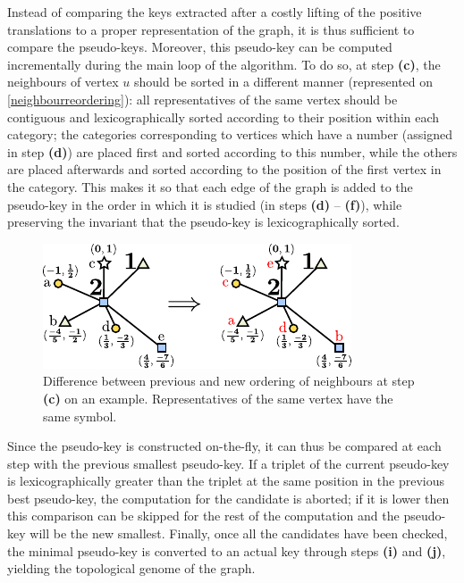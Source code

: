 \documentclass[main.tex]{subfiles}
\begin{document}
Instead of comparing the keys extracted after a costly lifting of the positive translations to a proper representation of the graph, it is thus sufficient to compare the pseudo-keys. Moreover, this pseudo-key can be computed incrementally during the main loop of the algorithm. To do so, at step {\bf (c)}, the neighbours of vertex $u$ should be sorted in a different manner (represented on \autoref{neighbourreordering}): all representatives of the same vertex should be contiguous and lexicographically sorted according to their position within each category; the categories corresponding to vertices which have a number (assigned in step {\bf (d)}) are placed first and sorted according to this number, while the others are placed afterwards and sorted according to the position of the first vertex in the category. This makes it so that each edge of the graph is added to the pseudo-key in the order in which it is studied (in steps {\bf (d)} -- {\bf (f)}), while preserving the invariant that the pseudo-key is lexicographically sorted.

\begin{figure}[t]
	\centering
	\includegraphics[width=0.85\linewidth]{figures/topology/pseudokey.pdf}
	\caption{Difference between previous and new ordering of neighbours at step {\bf (c)} on an example. Representatives of the same vertex have the same symbol.}
	\label{neighbourreordering}
\end{figure}

Since the pseudo-key is constructed on-the-fly, it can thus be compared at each step with the previous smallest pseudo-key. If a triplet of the current pseudo-key is lexicographically greater than the triplet at the same position in the previous best pseudo-key, the computation for the candidate is aborted; if it is lower then this comparison can be skipped for the rest of the computation and the pseudo-key will be the new smallest. Finally, once all the candidates have been checked, the minimal pseudo-key is converted to an actual key through steps {\bf (i)} and {\bf (j)}, yielding the topological genome of the graph.
\end{document}
